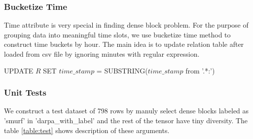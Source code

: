 \subsubsection{Bucketize Time}
Time attribute is very special in finding dense block problem. For the purpose of grouping data into meaningful time slots, we use bucketize time method to construct time buckets by hour.
The main idea is to update relation table after loaded from csv file by ignoring minutes with regular expression. 
\begin{algorithmic}
\STATE UPDATE $R$ SET $time\_stamp$ = SUBSTRING($time\_stamp$ from '.*:')
\end{algorithmic}

\subsubsection{Unit Tests}
We construct a test dataset of 798 rows by manuly select dense blocks labeled as 'smurf' in 'darpa\_with\_label' and the rest of the tensor have tiny diversity. The table \ref{table:test} shows description of these arguments.
 
